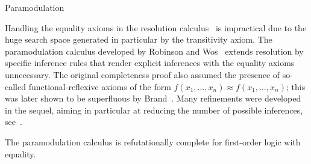 \begin{entry}{Paramodulation}
\begin{history}
Handling the equality axioms in the resolution calculus~
is impractical due to the huge search space generated in particular
by the transitivity axiom.
The paramodulation calculus
developed by Robinson and Wos~\cite{RobinsonWos1969} extends
resolution by specific inference rules that
render explicit inferences with the equality axioms unnecessary.
The original completeness proof also assumed the
presence of so-called functional-reflexive axioms of the
form
$f(x_1,\dots,x_n) \approx f(x_1,\dots,x_n)$;
this was later shown to be superfluous by Brand~\cite{Brand1975SIAMJC}.
Many refinements were developed in the sequel,
aiming in particular at reducing the number of possible inferences,
see~.

\end{history}

\begin{technicalities}
The paramodulation calculus is refutationally complete for
first-order logic with equality.
\end{technicalities}













\end{entry}
